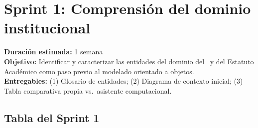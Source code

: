 \section*{Sprint 1: Comprensión del dominio institucional}
\label{sprint:1}

\begin{tcolorbox}[sprintBox, title={Sprint 1 — Comprensión del dominio institucional}]
  \textbf{Duración estimada:} 1 semana\\
  \textbf{Objetivo:} Identificar y caracterizar las entidades del dominio
  del \acuerdo\ y del Estatuto Académico como paso previo al modelado orientado a objetos.\\
  \textbf{Entregables:} (1) Glosario de entidades; (2) Diagrama de contexto
  inicial; (3) Tabla comparativa propia vs.\ asistente computacional.
\end{tcolorbox}

\bigskip

\subsection*{Tabla del Sprint 1}

